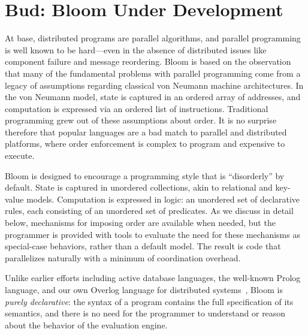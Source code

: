 \section{Bud: Bloom Under Development}
\label{sec:lang}
At base, distributed programs are parallel algorithms, and parallel programming is well known to be hard---even in the absence of distributed issues like component failure and message reordering.  Bloom is based on the observation that many of the fundamental problems with parallel programming come from a legacy of assumptions regarding classical von Neumann machine architectures.  In the von Neumann model, state is captured in an ordered array of addresses, and computation is expressed via an ordered list of instructions.  Traditional programming grew out of these assumptions about order.  It is no surprise therefore that popular languages are a bad match to parallel and distributed platforms, where order enforcement is complex to program and expensive to execute.

Bloom is designed to encourage a programming style that is ``disorderly'' by default.  State is captured in unordered collections, akin to relational and key-value models.  Computation is expressed in logic: an unordered set of declarative rules, each consisting of an unordered set of predicates.  As we discuss in detail below, mechanisms for imposing order are available when needed, but the programmer is provided with tools to evaluate the need for these mechanisms as special-case behaviors, rather than a default model.  The result is code that parallelizes naturally with a minimum of coordination overhead.

 
Unlike earlier efforts including active database languages, the well-known Prolog language, and our own Overlog language for distributed systems~\cite{p2}, Bloom is {\em purely declarative}: the syntax of a program contains the full specification of its semantics, and there is no need for the programmer to understand or reason about the behavior of the evaluation engine.  

